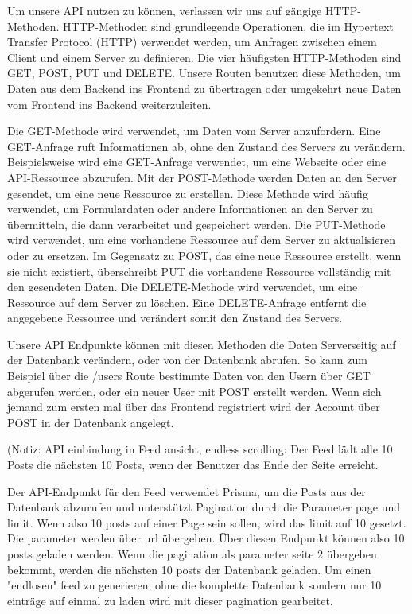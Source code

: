 \documentclass[a4paper,12pt]{article}
\begin{document}
Um unsere API nutzen zu können, verlassen wir uns auf gängige HTTP-Methoden. HTTP-Methoden sind grundlegende Operationen, die im Hypertext Transfer Protocol (HTTP) verwendet werden, um Anfragen zwischen einem Client und einem Server zu definieren. Die vier häufigsten HTTP-Methoden sind GET, POST, PUT und DELETE. Unsere Routen benutzen diese Methoden, um Daten aus dem Backend ins Frontend zu übertragen oder umgekehrt neue Daten vom Frontend ins Backend weiterzuleiten.

Die GET-Methode wird verwendet, um Daten vom Server anzufordern. Eine GET-Anfrage ruft Informationen ab, ohne den Zustand des Servers zu verändern. Beispielsweise wird eine GET-Anfrage verwendet, um eine Webseite oder eine API-Ressource abzurufen.
Mit der POST-Methode werden Daten an den Server gesendet, um eine neue Ressource zu erstellen. Diese Methode wird häufig verwendet, um Formulardaten oder andere Informationen an den Server zu übermitteln, die dann verarbeitet und gespeichert werden.
Die PUT-Methode wird verwendet, um eine vorhandene Ressource auf dem Server zu aktualisieren oder zu ersetzen. Im Gegensatz zu POST, das eine neue Ressource erstellt, wenn sie nicht existiert, überschreibt PUT die vorhandene Ressource vollständig mit den gesendeten Daten.
Die DELETE-Methode wird verwendet, um eine Ressource auf dem Server zu löschen. Eine DELETE-Anfrage entfernt die angegebene Ressource und verändert somit den Zustand des Servers.

Unsere API Endpunkte können mit diesen Methoden die Daten Serverseitig auf der Datenbank verändern, oder von der Datenbank abrufen. So kann zum Beispiel über die /users Route bestimmte Daten von den Usern über GET abgerufen werden, oder ein neuer User mit POST erstellt werden. Wenn sich jemand zum ersten mal über das Frontend registriert wird der Account über POST in der Datenbank angelegt.

(Notiz: API einbindung in Feed ansicht, endless scrolling:
 Der Feed lädt alle 10 Posts die nächsten 10 Posts, wenn der Benutzer das Ende der Seite erreicht.

 Der API-Endpunkt für den Feed verwendet Prisma, um die Posts aus der Datenbank abzurufen und unterstützt Pagination durch die Parameter page und limit. Wenn also 10 posts auf einer Page sein sollen, wird das limit auf 10 gesetzt. Die parameter werden über url übergeben.
 Über diesen Endpunkt können also 10 posts geladen werden. Wenn die pagination als parameter seite 2 übergeben bekommt, werden die nächsten 10 posts der Datenbank geladen. Um einen "endlosen" feed zu generieren, ohne die komplette Datenbank sondern nur 10 einträge auf einmal zu laden wird mit dieser pagination gearbeitet.
\end{document}

